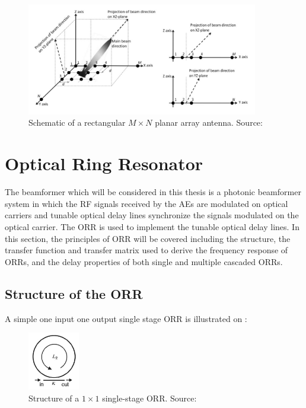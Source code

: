 \begin{figure}[h]
	\centering
	\includegraphics[width=0.9\textwidth]{images/planar_antenna}
	\caption{Schematic of a rectangular $M\times N$ planar array antenna. Source: \citep{zhuang2010ring}}
	\label{fig:planar_antenna}
\end{figure}

\section{Optical Ring Resonator}
The beamformer which will be considered in this thesis is a photonic beamformer system in which the \ac{RF} signals received by the AEs are modulated on optical carriers and tunable
optical delay lines synchronize the signals modulated on the optical carrier. The \ac{ORR} is used to implement the tunable optical delay lines. In this section, the principles of ORR will be covered including the structure, the transfer function and transfer matrix used to derive the frequency response of ORRs, and the delay properties of both single and multiple cascaded ORRs. 

\subsection{Structure of the \ac{ORR}}
A simple one input one output single stage ORR is illustrated on :

\begin{figure}[h]
	\centering
	\includegraphics[width=0.2\textwidth]{images/single_stage_ORR}
	\caption{Structure of a $1 \times 1$ single-stage ORR. Source: \citep{zhuang2010ring}}
	\label{fig:single_stage_ORR}
\end{figure}


